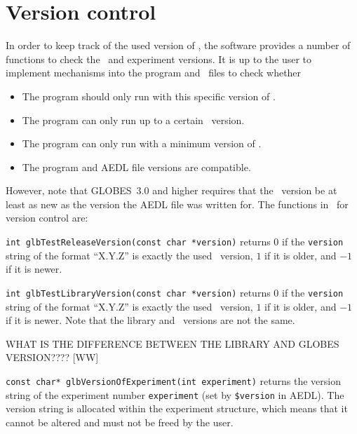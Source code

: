\section{Version control}
\label{sec:versioning}

In order to keep track of the used version of \GLOBES , the software
provides a number of functions to check the \GLOBES\ and experiment
versions. It is up to the user to implement mechanisms into the
program and \AEDL\ files to check whether
\begin{itemize}
\item
 The program should only run with this specific version of \GLOBES .
\item
 The program can only run up to a certain \GLOBES\ version.
\item
 The program can only run with a minimum version of \GLOBES .
\item
 The program and AEDL file versions are compatible.
\end{itemize}
However, note that GLOBES~3.0 and higher requires that the \GLOBES\ version be at least as new as the
version the AEDL file was written for.
%
The functions in \GLOBES\ for version control are:
\begin{function}
{\tt int glbTestReleaseVersion(const char *version)} returns $0$ if
the {\tt version} string of the format ``X.Y.Z'' is exactly the
used \GLOBES\ version, $1$ if it is older, and $-1$ if it is newer. 
\end{function}
\begin{function}
{\tt int glbTestLibraryVersion(const char *version)} returns $0$ if
the {\tt version} string of the format ``X.Y.Z'' is exactly the
used \GLOBES\ version, $1$ if it is older, and $-1$ if it is newer.
Note that the library and \GLOBES\ versions are not the same. 
\end{function}
WHAT IS THE DIFFERENCE BETWEEN THE LIBRARY AND GLOBES VERSION???? [WW]
\begin{function}
{\tt const char* glbVersionOfExperiment(int experiment)} returns
the version string of the experiment number {\tt experiment} (set by
{\tt \$version} in AEDL).
The version string is allocated within the experiment structure, which means
that it cannot be altered and must not be freed by the
user.
\end{function}


